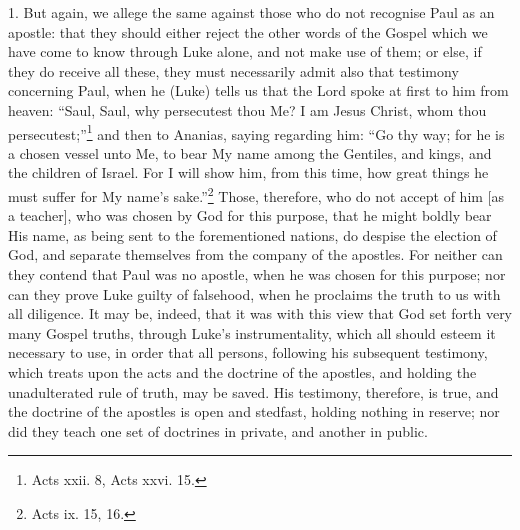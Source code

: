 1. But again, we allege the same against those who do not recognise Paul as an apostle: that they should either reject the other words of the Gospel which we have come to know through Luke alone, and not make use of them; or else, if they do receive all these, they must necessarily admit also that testimony concerning Paul, when he (Luke) tells us that the Lord spoke at first to him from heaven: “Saul, Saul, why persecutest thou Me? I am Jesus Christ, whom thou persecutest;”\footnote{Acts xxii. 8, Acts xxvi. 15.} and then to Ananias, saying regarding him: “Go thy way; for he is a chosen vessel unto Me, to bear My name among the Gentiles, and kings, and the children of Israel. For I will show him, from this time, how great things he must suffer for My name’s sake.”\footnote{Acts ix. 15, 16.} Those, therefore, who do not accept of him [as a teacher], who was chosen by God for this purpose, that he might boldly bear His name, as being sent to the forementioned nations, do despise the election of God, and separate themselves from the company of the apostles. For neither can they contend that Paul was no apostle, when he was chosen for this purpose; nor can they prove Luke guilty of falsehood, when he proclaims the truth to us with all diligence. It may be, indeed, that it was with this view that God set forth very many Gospel truths, through Luke’s instrumentality, which all should esteem it necessary to use, in order that all persons, following his subsequent testimony, which treats upon the acts and the doctrine of the apostles, and holding the unadulterated rule of truth, may be saved. His testimony, therefore, is true, and the doctrine of the apostles is open and stedfast, holding nothing in reserve; nor did they teach one set of doctrines in private, and another in public.

